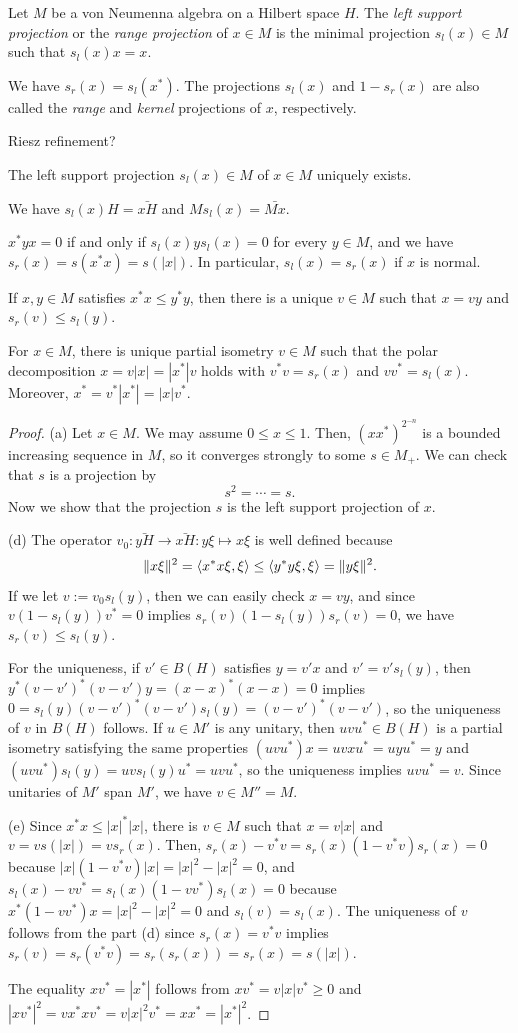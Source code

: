 \documentclass{../../large}
\begin{document}
\begin{prb}
Let $M$ be a von Neumenna algebra on a Hilbert space $H$.
The \emph{left support projection} or the \emph{range projection} of $x\in M$ is the minimal projection $s_l(x)\in M$ such that $s_l(x)x=x$.

We have $s_r(x)=s_l(x^*)$.
The projections $s_l(x)$ and $1-s_r(x)$ are also called the \emph{range} and \emph{kernel} projections of $x$, respectively.

Riesz refinement?
\begin{parts}
\item The left support projection $s_l(x)\in M$ of $x\in M$ uniquely exists.
\item We have $s_l(x)H=\bar{xH}$ and $Ms_l(x)=\bar{Mx}$.
\item $x^*yx=0$ if and only if $s_l(x)ys_l(x)=0$ for every $y\in M$, and we have $s_r(x)=s(x^*x)=s(|x|)$. In particular, $s_l(x)=s_r(x)$ if $x$ is normal.
\item If $x,y\in M$ satisfies $x^*x\le y^*y$, then there is a unique $v\in M$ such that $x=vy$ and $s_r(v)\le s_l(y)$.
\item For $x\in M$, there is unique partial isometry $v\in M$ such that the polar decomposition $x=v|x|=|x^*|v$ holds with $v^*v=s_r(x)$ and $vv^*=s_l(x)$. Moreover, $x^*=v^*|x^*|=|x|v^*$.
\end{parts}
\end{prb}
\begin{proof}
(a)
Let $x\in M$.
We may assume $0\le x\le1$.
Then, $(xx^*)^{2^{-n}}$ is a bounded increasing sequence in $M$, so it converges strongly to some $s\in M_+$.
We can check that $s$ is a projection by
\[s^2=\cdots=s.\]
Now we show that the projection $s$ is the left support projection of $x$.

(d)
The operator $v_0:\bar{yH}\to\bar{xH}:y\xi\mapsto x\xi$ is well defined because
\[\|x\xi\|^2=\langle x^*x\xi,\xi\rangle\le\langle y^*y\xi,\xi\rangle=\|y\xi\|^2.\]
If we let $v:=v_0s_l(y)$, then we can easily check $x=vy$, and since $v(1-s_l(y))v^*=0$ implies $s_r(v)(1-s_l(y))s_r(v)=0$, we have $s_r(v)\le s_l(y)$.

For the uniqueness, if $v'\in B(H)$ satisfies $y=v'x$ and $v'=v's_l(y)$, then $y^*(v-v')^*(v-v')y=(x-x)^*(x-x)=0$ implies $0=s_l(y)(v-v')^*(v-v')s_l(y)=(v-v')^*(v-v')$, so the uniqueness of $v$ in $B(H)$ follows.
If $u\in M'$ is any unitary, then $uvu^*\in B(H)$ is a partial isometry satisfying the same properties $(uvu^*)x=uvxu^*=uyu^*=y$ and $(uvu^*)s_l(y)=uvs_l(y)u^*=uvu^*$, so the uniqueness implies $uvu^*=v$.
Since unitaries of $M'$ span $M'$, we have $v\in M''=M$.

(e)
Since $x^*x\le|x|^*|x|$, there is $v\in M$ such that $x=v|x|$ and $v=vs(|x|)=vs_r(x)$.
Then, $s_r(x)-v^*v=s_r(x)(1-v^*v)s_r(x)=0$ because $|x|(1-v^*v)|x|=|x|^2-|x|^2=0$, and $s_l(x)-vv^*=s_l(x)(1-vv^*)s_l(x)=0$ because $x^*(1-vv^*)x=|x|^2-|x|^2=0$ and $s_l(v)=s_l(x)$.
The uniqueness of $v$ follows from the part (d) since $s_r(x)=v^*v$ implies $s_r(v)=s_r(v^*v)=s_r(s_r(x))=s_r(x)=s(|x|)$.

The equality $xv^*=|x^*|$ follows from $xv^*=v|x|v^*\ge0$ and $|xv^*|^2=vx^*xv^*=v|x|^2v^*=xx^*=|x^*|^2$.
\end{proof}
\end{document}
